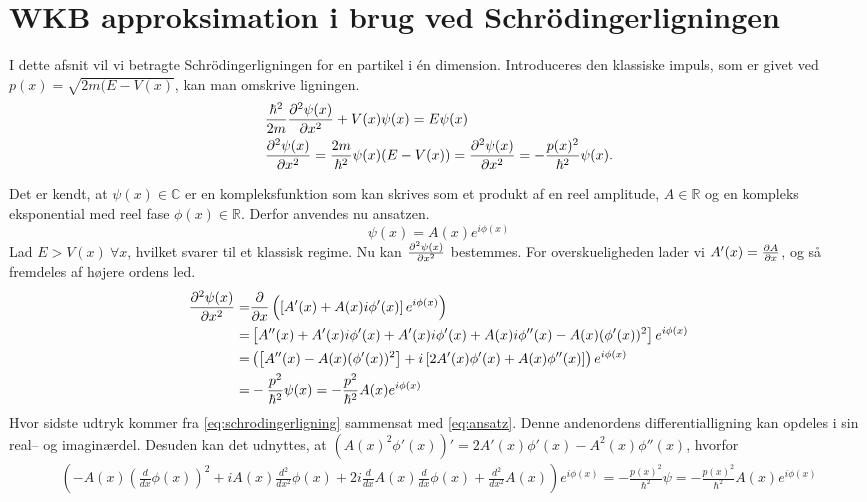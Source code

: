 \section{WKB approksimation i brug ved Schrödingerligningen}
I dette afsnit vil vi betragte Schrödingerligningen for en partikel i én dimension. Introduceres den klassiske impuls, som er givet ved $p(x) = \sqrt{2m(E-V(x)}$, kan man omskrive ligningen.
%
\begin{align}
    & \frac{\hbar^2}{2m} \pdiff[2]{\psi(x)}{x} + V(x)\psi(x) = E\psi(x) \\
    & \pdiff[2]{\psi(x)}{x} = \frac{2m}{\hbar^2}\psi(x)(E - V(x))  = \pdiff[2]{\psi(x)}{x} = - \frac{p(x)^2}{\hbar^2}\psi(x).
    \label{eq:schrodingerligning}
\end{align}

Det er kendt, at $\psi(x) \in \mathbb{C}$ er en kompleksfunktion som kan skrives som et produkt af en reel amplitude, $A \in \mathbb{R}$ og en kompleks eksponential med reel fase $\phi(x)\in \mathbb{R}$. Derfor anvendes nu ansatzen. 
\begin{equation}
    \psi(x) = A(x) e^{i \phi(x)}
    \label{eq:ansatz}
\end{equation}
Lad $E > V(x) \ \forall x$, hvilket svarer til et klassisk regime.
Nu kan $\pdiff[2]{\psi(x)}{x}$ bestemmes. For overskueligheden lader vi $A'(x) = \pdiff{A}{x}$, og så fremdeles af højere ordens led.
\begin{align}
    \pdiff[2]{\psi(x)}{x} = & \pdiff{}{x}\left( \left[ A'(x) + A(x)i\phi'(x) \right]e^{i\phi(x)} \right) \\
    = & \left[ A''(x) + A'(x)i\phi'(x) + A'(x)i\phi'(x) + A(x)i\phi''(x) - A(x)( \phi'(x))^2\right]e^{i\phi(x)} \\
    = & \left(\left[ A''(x) - A(x)(\phi'(x))^2\right] + i \left[2A'(x)\phi'(x) + A(x)\phi''(x) \right]\right)e^{i\phi(x)}\\
    = & -\frac{p^2}{\hbar^2}\psi(x) = -\frac{p^2}{\hbar^2} A(x)e^{i\phi(x)}
    \label{eq:regime}
\end{align}
Hvor sidste udtryk kommer fra \cref{eq:schrodingerligning} sammensat med \cref{eq:ansatz}.
Denne andenordens differentialligning kan opdeles i sin real-- og imaginærdel. Desuden kan det udnyttes, at $\left( A(x)^2\phi'(x) \right)' = 2A'(x)\phi'(x) - A^2(x)\phi''(x)$, hvorfor
\begin{align}
    \left(- A{\left (x \right )} \left(\frac{d}{d x} \phi{\left (x \right )}\right)^{2} + i A{\left (x \right )} \frac{d^{2}}{d x^{2}}  \phi{\left (x \right )} + 2 i \frac{d}{d x} A{\left (x \right )} \frac{d}{d x} \phi{\left (x \right )} + \frac{d^{2}}{d x^{2}}  A{\left (x \right )}\right) e^{i \phi{\left (x \right )}} = - \frac{p(x)^2}{\hbar^2} \psi = - \frac{p(x)^2}{\hbar^2} A(x) e^{i \phi(x)}
    \label{eq:udskrevet}
\end{align}

